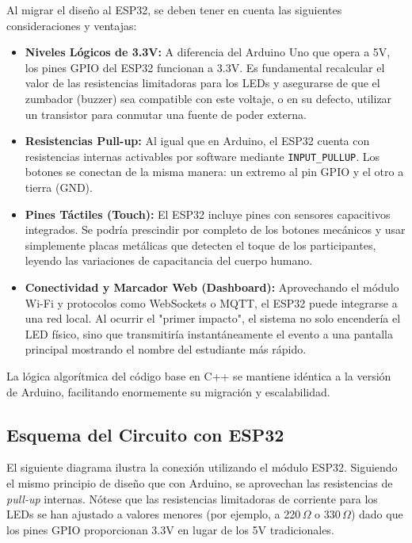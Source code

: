 \documentclass[12pt,a4paper]{article}
\begin{document}
Al migrar el diseño al ESP32, se deben tener en cuenta las siguientes consideraciones y ventajas:

\begin{itemize}
    \item \textbf{Niveles Lógicos de 3.3V:} A diferencia del Arduino Uno que opera a 5V, los pines GPIO del ESP32 funcionan a 3.3V. Es fundamental recalcular el valor de las resistencias limitadoras para los LEDs y asegurarse de que el zumbador (buzzer) sea compatible con este voltaje, o en su defecto, utilizar un transistor para conmutar una fuente de poder externa.
    \item \textbf{Resistencias Pull-up:} Al igual que en Arduino, el ESP32 cuenta con resistencias internas activables por software mediante \texttt{INPUT\_PULLUP}. Los botones se conectan de la misma manera: un extremo al pin GPIO y el otro a tierra (GND).
    \item \textbf{Pines Táctiles (Touch):} El ESP32 incluye pines con sensores capacitivos integrados. Se podría prescindir por completo de los botones mecánicos y usar simplemente placas metálicas que detecten el toque de los participantes, leyendo las variaciones de capacitancia del cuerpo humano.
    \item \textbf{Conectividad y Marcador Web (Dashboard):} Aprovechando el módulo Wi-Fi y protocolos como WebSockets o MQTT, el ESP32 puede integrarse a una red local. Al ocurrir el "primer impacto", el sistema no solo encendería el LED físico, sino que transmitiría instantáneamente el evento a una pantalla principal mostrando el nombre del estudiante más rápido.
\end{itemize}

La lógica algorítmica del código base en C++ se mantiene idéntica a la versión de Arduino, facilitando enormemente su migración y escalabilidad.

\subsection{Esquema del Circuito con ESP32}
El siguiente diagrama ilustra la conexión utilizando el módulo ESP32. Siguiendo el mismo principio de diseño que con Arduino, se aprovechan las resistencias de \textit{pull-up} internas. Nótese que las resistencias limitadoras de corriente para los LEDs se han ajustado a valores menores (por ejemplo, a 220\,$\Omega$ o 330\,$\Omega$) dado que los pines GPIO proporcionan 3.3V en lugar de los 5V tradicionales.
\end{document}
